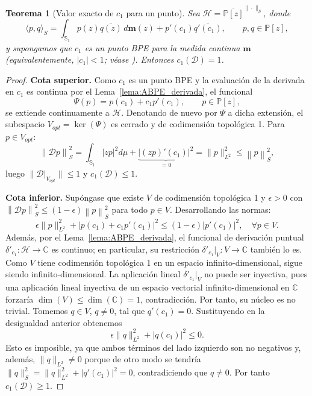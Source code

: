 \documentclass[12pt,a4paper]{article}
\newtheorem{theorem}{Teorema}
\theoremstyle{definition}
\theoremstyle{remark}
\newcommand{\Poly}{\mathbb{P}[z]}
\newcommand{\norm}[1]{\left\| #1 \right\|_S}
\newcommand{\abs}[1]{\left| #1 \right|}
\newcommand{\D}{\mathcal{D}}
\begin{document}
\begin{theorem}[Valor exacto de $c_1$ para un punto]
  \label{thm:c2_punto}
  Sea $\mathcal{H} = \overline{\Poly}^{\|\cdot\|_S}$, donde
  \begin{equation}
    \langle p, q \rangle_S = \int_{\mathbb{S}_1} p(z)\overline{q(z)} \, d\mathbf{m}(z) + p'(c_1)\overline{q'(c_1)}, \qquad p,q \in \Poly,
  \end{equation}
  y supongamos que $c_1$ es un punto BPE para la medida continua $\mathbf m$ (equivalentemente, $\abs{c_1}<1$; véase \cite{duren1970theory}). Entonces $c_1(\D) = 1$.
\end{theorem}

\begin{proof}
  \textbf{Cota superior.} Como $c_1$ es un punto BPE y la evaluación de la derivada en $c_1$ es continua por el Lema~\ref{lema:ABPE_derivada}, el funcional
  \[
    \Psi(p) = p(c_1) + c_1 p'(c_1), \qquad p \in \Poly,
  \]
  se extiende continuamente a $\mathcal{H}$. Denotando de nuevo por $\Psi$ a dicha extensión, el subespacio $V_{opt} = \ker(\Psi)$ es cerrado y de codimensión topológica 1. Para $p \in V_{opt}$:
  \[
    \norm{\D p}^2 = \int_{\mathbb{S}_1} \abs{zp}^2 d\mu + \underbrace{\abs{(zp)'(c_1)}^2}_{=0} = \|p\|_{L^2}^2 \le \norm{p}^2,
  \]
  luego $\|\D|_{V_{opt}}\| \le 1$ y $c_1(\D) \le 1$.

  \textbf{Cota inferior.} Supóngase que existe $V$ de codimensión topológica 1 y $\epsilon > 0$ con $\norm{\D p}^2 \le (1-\epsilon)\norm{p}^2$ para todo $p \in V$. Desarrollando las normas:
  \[
    \epsilon \|p\|_{L^2}^2 + \abs{p(c_1) + c_1 p'(c_1)}^2 \le (1-\epsilon)\abs{p'(c_1)}^2, \quad \forall p \in V.
  \]
  Además, por el Lema~\ref{lema:ABPE_derivada}, el funcional de derivación puntual $\delta'_{c_1}: \mathcal{H} \to \mathbb{C}$ es continuo; en particular, su restricción $\delta'_{c_1}|_V : V \to \mathbb{C}$ también lo es. Como $V$ tiene codimensión topológica 1 en un espacio infinito-dimensional, sigue siendo infinito-dimensional. La aplicación lineal $\delta'_{c_1}|_V$ no puede ser inyectiva, pues una aplicación lineal inyectiva de un espacio vectorial infinito-dimensional en $\mathbb{C}$ forzaría $\dim(V) \leq \dim(\mathbb{C}) = 1$, contradicción. Por tanto, su núcleo es no trivial. Tomemos $q \in V$, $q \neq 0$, tal que $q'(c_1)=0$. Sustituyendo en la desigualdad anterior obtenemos
  \[
    \epsilon \|q\|_{L^2}^2 + \abs{q(c_1)}^2 \le 0.
  \]
  Esto es imposible, ya que ambos términos del lado izquierdo son no negativos y, además, $\|q\|_{L^2} \neq 0$ porque de otro modo se tendría $\|q\|_S^2 = \|q\|_{L^2}^2 + \abs{q'(c_1)}^2 = 0$, contradiciendo que $q \neq 0$. Por tanto $c_1(\D) \ge 1$.
\end{proof}
\end{document}
